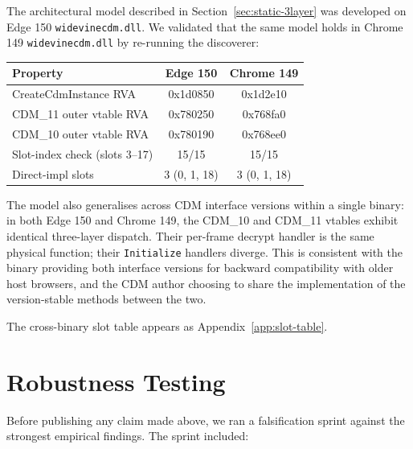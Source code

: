 \documentclass[11pt,letterpaper]{article}
\let\oldsection\section
\renewcommand{\section}{\clearpage\oldsection}
\begin{document}
The architectural model described in
Section~\ref{sec:static-3layer} was developed on Edge 150
\texttt{widevinecdm.dll}. We validated that the same model holds in
Chrome 149 \texttt{widevinecdm.dll} by re-running the discoverer:

\begin{center}\small
\begin{tabular}{lcc}
\toprule
\textbf{Property} & \textbf{Edge 150} & \textbf{Chrome 149} \\
\midrule
CreateCdmInstance RVA          & 0x1d0850 & 0x1d2e10 \\
CDM\_11 outer vtable RVA       & 0x780250 & 0x768fa0 \\
CDM\_10 outer vtable RVA       & 0x780190 & 0x768ee0 \\
Slot-index check (slots 3--17) & 15/15    & 15/15    \\
Direct-impl slots              & 3 (0, 1, 18) & 3 (0, 1, 18) \\
\bottomrule
\end{tabular}
\end{center}

\noindent The model also generalises across CDM interface versions
within a single binary: in both Edge 150 and Chrome 149, the CDM\_10
and CDM\_11 vtables exhibit identical three-layer dispatch. Their
per-frame decrypt handler is the same physical function; their
\texttt{Initialize} handlers diverge. This is consistent with the
binary providing both interface versions for backward compatibility
with older host browsers, and the CDM author choosing to share the
implementation of the version-stable methods between the two.

The cross-binary slot table appears as Appendix~\ref{app:slot-table}.

\section{Robustness Testing}
\label{sec:robustness}

Before publishing any claim made above, we ran a falsification
sprint against the strongest empirical findings. The sprint
included:
\end{document}
